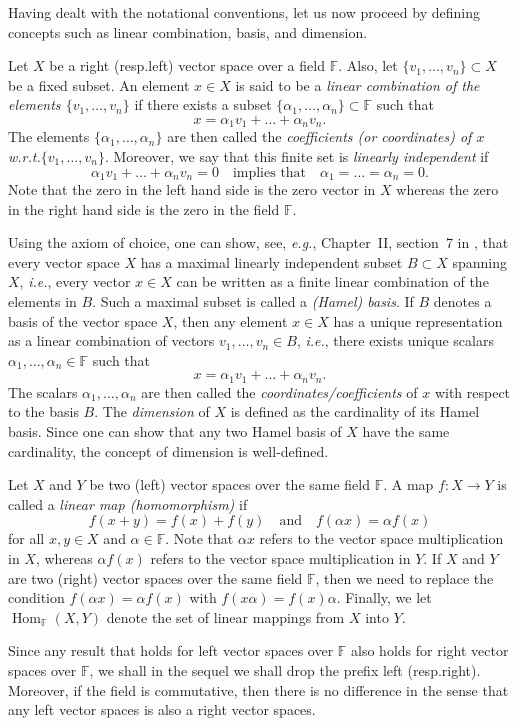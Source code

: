 \documentclass[a4paper]{paper}
\makeatletter
\newcommand{\Field}{\mathbb{F}}
\DeclareMathOperator{\Hom}{Hom}
\newcommand{\ie}{\textsl{i.e.}\xspace}
\newcommand{\eg}{\textsl{e.g.}\xspace}
\newcommand{\wrt}{{w.r.t.}\@\xspace}
\makeatother
\begin{document}
Having dealt with the notational conventions, let us now proceed by defining concepts such 
as linear combination, basis, and dimension.
\begin{definition}
   Let $X$ be a right (resp.\@ left) vector space over a field $\Field$. Also, 
   let $\{ v_1, \ldots, v_{n} \}  \subset X$ be a fixed subset. An element $x\in X$ 
   is said to be a \emph{linear combination of the elements $\{ v_1, \ldots, v_{n} \}$} if 
   there exists a subset $\{ \alpha_1,\ldots,\alpha_{n} \} \subset \Field$ such that 
   \[  x= \alpha_1 v_1 + \ldots +  \alpha_{n} v_{n}. \]
   The elements $\{ \alpha_1,\ldots,\alpha_{n} \}$ are then called the \emph{coefficients 
  (or coordinates)  of $x$ \wrt $\{ v_1, \ldots, v_{n} \}$}. Moreover, we say that this finite 
  set is \emph{linearly independent} if 
   \[ \alpha_1 v_1 + \ldots + \alpha_{n} v_{n} =0
      \quad\text{implies that}\quad \alpha_1=\ldots=\alpha_{n}=0. \]
  Note that the zero in the left hand side is the zero vector in $X$ whereas the zero in the right 
  hand side is the zero in the field $\Field$.
\end{definition}
Using the axiom of choice, one can show, see, \eg, Chapter~II, section~7 in \cite{Bo89}, 
that every vector space $X$ has a maximal linearly independent subset $B \subset X$ 
spanning $X$, \ie, every vector $x\in X$ can be written as a finite linear combination 
of the elements in $B$. Such a maximal subset is called a \emph{(Hamel) basis}. If 
$B$ denotes a basis of the vector space $X$, then any element $x\in X$ has a 
unique representation as a linear combination of vectors $v_1,\ldots,v_{n}\in B$, \ie, there 
exists unique scalars $\alpha_1,\ldots,\alpha_{n}\in\Field$ such that 
\[ x = \alpha_1 v_1 + \ldots + \alpha_{n} v_{n}. \]
The scalars $\alpha_1,\ldots,\alpha_{n}$ are then called the  \emph{coordinates/coefficients}
of $x$ with respect to the basis $B$. The \emph{dimension} of $X$ is defined as the cardinality 
of its Hamel basis. Since one can show that any two Hamel basis of $X$ 
have the same cardinality, the concept of dimension is well-defined.
\begin{definition}
  Let $X$ and $Y$ be two (left) vector spaces over the same field $\Field$. A map
  $f \colon X \to Y$ is called a \emph{linear map (homomorphism)} if
  \[  f(x+y)=f(x)+f(y) \quad\text{and}\quad
      f(\alpha x)=\alpha f(x)  \]
  for all $x,y\in X$ and $\alpha\in \Field$.
  Note that $\alpha x$ refers to the vector space multiplication in $X$, whereas $\alpha f(x)$
  refers to the vector space multiplication in $Y$.
  If $X$ and $Y$ are two (right) vector spaces over the same field $\Field$, then we need to
  replace the condition $f(\alpha x)=\alpha f(x)$ with $f(x\alpha)= f(x) \alpha$.
  Finally,  we let  $\Hom_{\Field}(X,Y)$ denote the set of linear mappings from $X$ into $Y$.
\end{definition}   
Since any result that holds for left vector spaces over $\Field$ also holds for right vector spaces 
over $\Field$, we shall in the sequel we shall drop the prefix left (resp.\@ right). Moreover, if
the field is commutative, then there is no difference in the sense that any left vector spaces
is also a right vector spaces.
\end{document}
